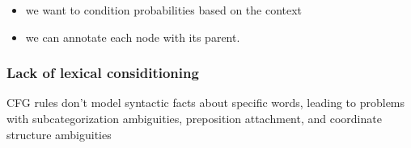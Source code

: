 \documentclass[11pt]{article}
\begin{document}
\begin{minipage}[l]{.5\linewidth}
    \begin{figure}[H]
        \centering
    \end{figure}    
\end{minipage}\hfill
\begin{minipage}[r]{.48\linewidth}
    \begin{itemize}
        \item we want to condition probabilities based on the context
        \item we can annotate each node with its parent.
    \end{itemize}
\end{minipage}

\begin{figure}[H]
    \centering
\end{figure}    

\subsubsection{Lack of lexical considitioning}

CFG rules don't model syntactic facts about speciﬁc words, leading to problems with subcategorization ambiguities, preposition attachment, and coordinate structure ambiguities
\end{document}
